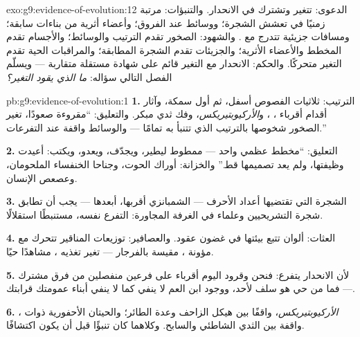 \begin{solution}{exo:g9:evidence-of-evolution:12}
الدعوى:  تتغير وتشترك في الانحدار. والتنبؤات:
 مرتبة زمنيًا في تعشش الشجرة؛ ووسائط عند الفروق؛
وأعضاء أثرية من بناءات سابقة؛ ومسافات جزيئية تتدرج مع
. والشهود: الصخور تقدم الترتيب والوسائط؛ والأجسام
تقدم المخطط والأعضاء الأثرية؛ والجزيئات تقدم الشجرة
المطابقة؛ والمراقبات الحية تقدم التغير متحركًا. والحكم:
الانحدار مع التغير قائم على شهادة مستقلة متقاربة ---
ويسلّم الفصل التالي سؤاله: \emph{ما الذي يقود التغير؟}
\end{solution}

\begin{solution}{pb:g9:evidence-of-evolution:1}
\textbf{1.} الترتيب: ثلاثيات الفصوص أسفل، ثم أول سمكة،
وآثار أقدام أقرباء ، ،
و\emph{الأركيوبتيريكس}، وفك ثدي مبكر. والتعليق: ``مقروءة
صعودًا، تغير الصخور شخوصها بالترتيب الذي تتنبأ به  تمامًا --- والوسائط واقفة عند التفرعات.''

\textbf{2.} التعليق: ``مخطط عظمي واحد --- ممطوط ليطير،
ويجدّف، ويعدو، ويكتب:  أعيدت وظيفتها، ولم يعد
تصميمها قط.'' والخزانة: أوراك الحوت، وجناحا الخنفساء
الملحومان، وعصعص الإنسان.

\textbf{3.} الشجرة التي تقتضيها أعداد الأحرف ---
الشمبانزي أقربها،  أبعدها --- يجب أن تطابق شجرة
التشريحيين وعلماء  في الغرفة المجاورة: التفرع
نفسه، مستنبطًا استقلالًا.

\textbf{4.} العثات: ألوان  تتبع بيئتها في غضون
عقود. والعصافير: توزيعات المناقير تتحرك مع مؤونة
، مقيسة بالفرجار --- تغير تغذيه ، مشاهدًا
حيًا.

\textbf{5.} لأن الانحدار يتفرع: فنحن وقرود اليوم أقرباء
على فرعين منفصلين من فرق مشترك --- فما من حي هو سلف
لأحد، ووجود ابن العم لا ينفي  كما لا ينفي أبناء
عمومتك قرابتك.

\textbf{6.} \emph{الأركيوبتيريكس}، واقفًا بين هيكل
الزاحف وعدة الطائر؛ والحيتان الأحفورية ذوات ،
واقفة بين الثدي الشاطئي والسابح. وكلاهما كان تنبؤًا قبل
أن يكون اكتشافًا.


\end{solution}
